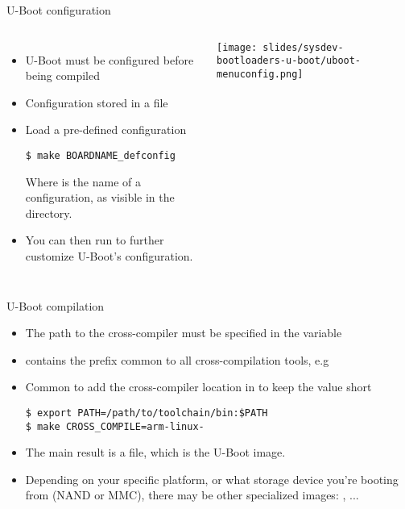\begin{frame}[fragile]{U-Boot configuration}
  \begin{columns}[T]
    \begin{itemize}
    \item U-Boot must be configured before being compiled
    \item Configuration stored in a  file
    \item Load a pre-defined configuration
\begin{verbatim}
$ make BOARDNAME_defconfig
\end{verbatim}
      Where  is the name of a configuration, as
      visible in the  directory.
    \item You can then run  to further customize
      U-Boot's configuration.
    \end{itemize}
    \texttt{[image: slides/sysdev-bootloaders-u-boot/uboot-menuconfig.png]}
  \end{columns}
\end{frame}

\begin{frame}[fragile]{U-Boot compilation}
  \begin{itemize}
  \item The path to the cross-compiler must be specified in the
     variable
  \item {} contains the prefix common to all
    cross-compilation tools, e.g 
  \item Common to add the cross-compiler location in  to
    keep the  value short
\begin{verbatim}
$ export PATH=/path/to/toolchain/bin:$PATH
$ make CROSS_COMPILE=arm-linux-
\end{verbatim}
  \item The main result is a  file, which is the
    U-Boot image.
  \item Depending on your specific platform, or what storage device
    you're booting from (NAND or MMC), there may be other specialized
    images: , ...
  \end{itemize}
\end{frame}

